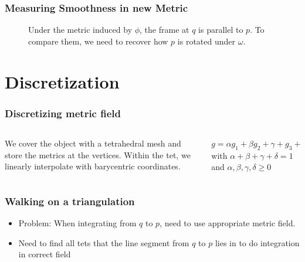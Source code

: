 \documentclass[
	11pt, %
	aspectratio=169, %
]{beamer}
\begin{document}
\begin{frame}
	\frametitle{Measuring Smoothness in new Metric}
	\begin{figure}[htb]
		\centering
		\def\svgwidth{0.5\linewidth}
		
		\caption{Under the metric induced by $\phi$, the frame at $q$ is parallel to $p$.
		To compare them, we need to recover how $p$ is rotated under $\omega$.}
		\label{fig:rotation}
	\end{figure}
\end{frame}


\section{Discretization}

\begin{frame}
	\frametitle{Discretizing metric field}
	\begin{columns}[c] %
	
		\begin{column}{0.65\textwidth} %
			\begin{figure}[htb]
				\centering
				\def\svgwidth{0.6\linewidth}
				
				\label{fig:discretization}
			\end{figure}
			We cover the object with a tetrahedral mesh and store
			the metrics at the vertices. Within the tet, we linearly interpolate with barycentric coordinates.
		\end{column}
		\begin{column}{0.35\textwidth} %
			\begin{figure}[htb]
				\centering
				\def\svgwidth{\linewidth}
				
				\label{fig:tet}
			\end{figure}
			$g=\alpha g_1 + \beta g_2 + \gamma + g_3 + \delta g_4$ with $\alpha+\beta+\gamma+\delta=1$
			and $\alpha,\beta,\gamma,\delta \ge 0$
		\end{column}
	\end{columns}
\end{frame}


\begin{frame}
	\frametitle{Walking on a triangulation}
	\begin{itemize}
		\item Problem: When integrating from $q$ to $p$, need
		to use appropriate metric field.
		\item Need to find all tets that the line segment from $q$ to $p$ lies in to
		do integration in correct field
		\begin{figure}[htb]
			\centering
			\def\svgwidth{0.9\linewidth}
			
			\label{fig:problem}
		\end{figure}
	\end{itemize}
	
\end{frame}
\end{document}
